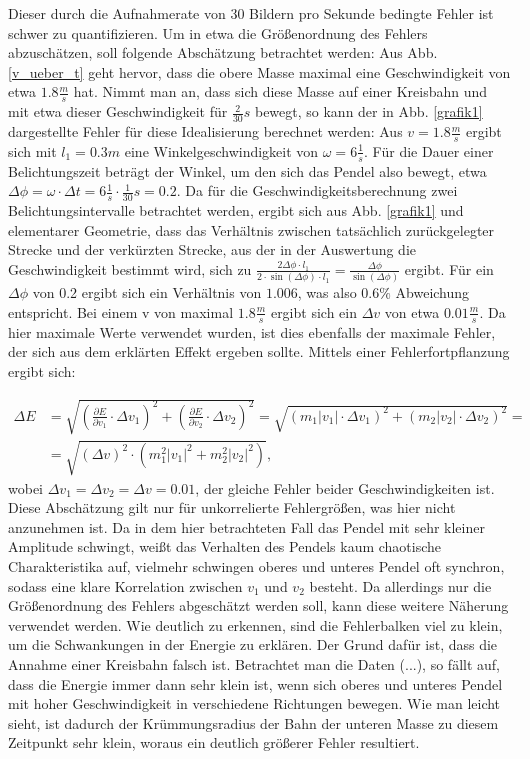 Dieser durch die Aufnahmerate von 30 Bildern pro Sekunde bedingte Fehler ist schwer zu quantifizieren. Um in etwa die Größenordnung 
des Fehlers abzuschätzen, soll folgende Abschätzung betrachtet werden: 
Aus Abb. \ref{v_ueber_t} geht hervor, dass die obere Masse maximal eine Geschwindigkeit von etwa $1.8 \frac{m}{s} $ hat. Nimmt man an, 
dass sich diese Masse auf einer Kreisbahn und mit etwa dieser Geschwindigkeit für $\frac{2}{30} s$ bewegt, so kann der in 
Abb. \ref{grafik1} dargestellte Fehler für diese Idealisierung berechnet werden: 
Aus $ v = 1.8 \frac{m}{s} $ ergibt sich mit $ l_1 = 0.3 m$ eine Winkelgeschwindigkeit von $ \omega = 6 \frac{1}{s} $. Für die Dauer
einer Belichtungszeit beträgt der Winkel, um den sich das Pendel also bewegt, etwa $ \Delta \phi = \omega \cdot \Delta t = 6 \frac{1}{s} \cdot \frac{1}{30} s = 0.2$. 
Da für die Geschwindigkeitsberechnung zwei Belichtungsintervalle betrachtet werden, ergibt sich aus Abb. \ref{grafik1} und elementarer 
Geometrie, dass das Verhältnis zwischen tatsächlich zurückgelegter Strecke und der verkürzten Strecke, aus der in der Auswertung die Geschwindigkeit bestimmt 
wird, sich zu $ \frac{2 \Delta \phi \cdot l_1}{2 \cdot \sin(\Delta \phi) \cdot l_1} = \frac{\Delta \phi}{\sin(\Delta \phi)} $
ergibt. Für ein $\Delta \phi $ von 0.2 ergibt sich ein Verhältnis von $1.006$, was also $0.6 \% $ Abweichung entspricht. Bei einem v von maximal $1.8 \frac{m}{s} $ ergibt sich ein $\Delta v $ von etwa $0.01 \frac{m}{s} $.  
Da hier maximale Werte verwendet wurden, ist dies ebenfalls der maximale Fehler, der sich aus dem erklärten Effekt ergeben sollte. 
Mittels einer Fehlerfortpflanzung ergibt sich: 

\begin{align}
\Delta E &= \sqrt{(\frac{\partial E}{\partial v_1} \cdot \Delta v_1)^2 + (\frac{\partial E}{\partial v_2} \cdot \Delta v_2)^2} = \sqrt{(m_1 |v_1| \cdot \Delta v_1)^2 + (m_2 |v_2| \cdot \Delta v_2)^2}= \nonumber \\ &= \sqrt{(\Delta v)^2 \cdot (m_1^2 |v_1|^2 + m_2^2 |v_2|^2)}, 
\end{align}
wobei $ \Delta v_1 = \Delta v_2 = \Delta v  = 0.01$, der gleiche Fehler beider Geschwindigkeiten ist. Diese Abschätzung gilt nur für unkorrelierte Fehlergrößen, was hier nicht anzunehmen ist. Da in dem hier betrachteten Fall das Pendel mit sehr kleiner Amplitude schwingt, weißt das Verhalten des Pendels kaum chaotische Charakteristika auf, vielmehr schwingen oberes und unteres Pendel oft synchron, sodass eine klare Korrelation zwischen $v_1 $ und $v_2$ besteht. Da allerdings nur die Größenordnung des Fehlers abgeschätzt werden soll, kann diese weitere Näherung verwendet werden. 
Wie deutlich zu erkennen, sind die Fehlerbalken viel zu klein, um die Schwankungen in der Energie zu erklären. Der Grund dafür ist, dass die Annahme einer Kreisbahn falsch ist. Betrachtet man die Daten (...), so fällt auf, dass die Energie immer dann sehr klein ist, wenn sich oberes und unteres Pendel mit hoher Geschwindigkeit in verschiedene Richtungen bewegen. Wie man leicht sieht, ist dadurch der Krümmungsradius der Bahn der unteren Masse zu diesem Zeitpunkt sehr klein, woraus ein deutlich größerer Fehler resultiert. 

